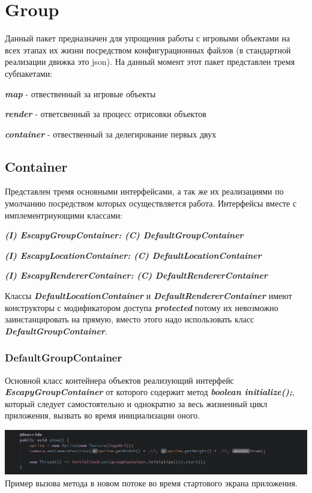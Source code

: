 \documentclass[11pt]{report}
\newenvironment{itemize*}%
  {\begin{itemize}%
    \setlength{\itemsep}{2pt}%
    \setlength{\parskip}{0.75pt}}%
  {\end{itemize}}
\begin{document}
\chapter{Group}
Данный пакет предназначен для упрощения работы с игровыми объектами на всех этапах их жизни посредством конфигурационных файлов (в стандартной реализации движка это json). На данный момент этот пакет представлен тремя субпакетами: \begin{itemize*}

	\item \textit{\textbf{map}} - отвественный за игровые объекты
	\item \textit{\textbf{render}} - ответсвенный за процесс отрисовки объектов
	\item \textit{\textbf{container}} - отвественный за делегирование первых двух
	
\end{itemize*}
\section{Container}
Представлен тремя основными интерфейсами, а так же их реализациями по умолчанию посредством которых осуществляется работа. Интерфейсы вместе с имплементриующими классами:
\begin{itemize*}
	\item \textit{\textbf{(I) EscapyGroupContainer: (C) DefaultGroupContainer}}
	\item \textit{\textbf{(I) EscapyLocationContainer: (C) DefaultLocationContainer}}
	\item \textit{\textbf{(I) EscapyRendererContainer: (C) DefaultRendererContainer}}
\end{itemize*}
Классы \textit{\textbf{DefaultLocationContainer}} и \textit{\textbf{DefaultRendererContainer}} имеют конструкторы с модификатором доступа \textit{\textbf{protected}} потому их невозможно заинстанцировать на прямую, вместо этого надо использовать класс \textit{\textbf{DefaultGroupContainer}}.
\subsection{DefaultGroupContainer}
Основной класс контейнера объектов реализующий интерфейс \textit{\textbf{EscapyGroupContainer}} от которого содержит метод \textit{\textbf{boolean initialize();}}, который следует самостоятельно и однократно за весь жизненный цикл приложения, вызвать во время инициализации оного.
\begin{center}
	\includegraphics[width=1.2\linewidth]{img/12.png} 
  	\label{img:120} 
  	Пример вызова метода в новом потоке во время стартового экрана приложения.
\end{center}
\end{document}
